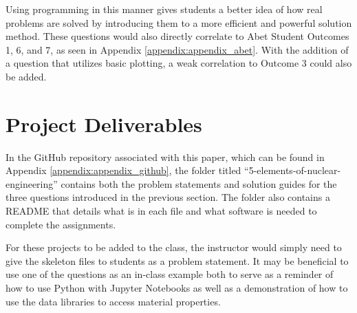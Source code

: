 Using programming in this manner gives students a better idea of how real problems are solved by
introducing them to a more efficient and powerful solution method. These questions would also 
directly correlate to Abet Student Outcomes 1, 6, and 7, as seen in Appendix 
\ref{appendix:appendix_abet}. With the addition of a question that utilizes basic plotting, a 
weak correlation to Outcome 3 could also be added.

\section{Project Deliverables}

In the GitHub repository associated with this paper, which can be found in 
Appendix \ref{appendix:appendix_github}, the folder titled ``5-elements-of-nuclear-engineering''
contains both the problem statements and solution guides for the three questions introduced in 
the previous section. The folder also contains a README that details what is in each file and 
what software is needed to complete the assignments. 

For these projects to be added to the class, the instructor would simply need to give the 
skeleton files to students as a problem statement. It may be beneficial to use one of the questions 
as an in-class example both to serve as a reminder of how to use Python with Jupyter Notebooks 
as well as a demonstration of how to use the data libraries to access material properties.